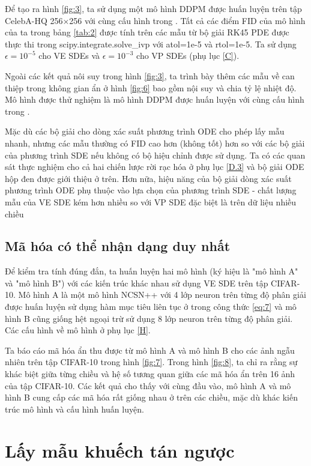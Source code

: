 \documentclass{article} %
\begin{document}
Để tạo ra hình \ref{fig:3}, ta sử dụng một mô hình DDPM được huấn luyện trên tập CelebA-HQ 256$\times$256 với cùng cấu hình trong \citep{ho2020denoising}.
Tất cả các điểm FID của mô hình của ta trong bảng \ref{tab:2} được tính trên các mẫu từ bộ giải RK45 PDE được thực thi trong scipy.integrate.solve\_ivp với atol=1e-5 và rtol=1e-5.
Ta sử dụng $\epsilon=10^{-5}$ cho VE SDEs và $\epsilon=10^{-3}$ cho VP SDEs (phụ lục \ref{C}).

Ngoài các kết quả nôi suy trong hình \ref{fig:3}, ta trình bày thêm các mẫu về can thiệp trong không gian ẩn ở hình \ref{fig:6} bao gồm nội suy và chia tỷ lệ nhiệt độ.
Mô hình được thử nghiệm là mô hình DDPM được huấn luyện với cùng cấu hình trong \citep{ho2020denoising}.

Mặc dù các bộ giải cho dòng xác suất phương trình ODE cho phép lấy mẫu nhanh, nhưng các mẫu thường có FID cao hơn (không tốt) hơn so với các bộ giải của phương trình SDE nếu không có bộ hiệu chỉnh được sử dụng.
Ta có các quan sát thực nghiệm cho cả hai chiến lược rời rạc hóa ở phụ lục \ref{D.3} và bộ giải ODE hộp đen được giới thiệu ở trên.
Hơn nữa, hiệu năng của bộ giải dòng xác suất phương trình ODE phụ thuộc vào lựa chọn của phương trình SDE - chất lượng mẫu của VE SDE kém hơn nhiều so với VP SDE đặc biệt là trên dữ liệu nhiều chiều 


\subsection{Mã hóa có thể nhận dạng duy nhất} \label{D.5}

Để kiểm tra tính đúng đắn, ta huấn luyện hai mô hình (ký hiệu là "mô hình A" và "mô hình B") với các kiến trúc khác nhau sử dụng VE SDE trên tập CIFAR-10.
Mô hình A là một mô hình NCSN++ với 4 lớp neuron trên từng độ phân giải được huấn luyện sử dụng hàm mục tiêu liên tục ở trong công thức \ref{eq:7} và mô hình B cũng giống hệt ngoại trừ sử dụng 8 lớp neuron trên từng độ phân giải.
Các cấu hình về mô hình ở phụ lục \ref{H}.

Ta báo cáo mã hóa ẩn thu được từ mô hình A và mô hình B cho các ảnh ngẫu nhiên trên tập CIFAR-10 trong hình \ref{fig:7}.
Trong hình \ref{fig:8}, ta chỉ ra rằng sự khác biệt giữa từng chiều và hệ số tương quan giữa các mã hóa ẩn trên 16 ảnh của tập CIFAR-10.
Các kết quả cho thấy với cùng đầu vào, mô hình A và mô hình B cung cấp các mã hóa rất giống nhau ở trên các chiều, mặc dù khác kiến trúc mô hình và cấu hình huấn luyện.

\section{Lấy mẫu khuếch tán ngược} \label{E}
\end{document}
